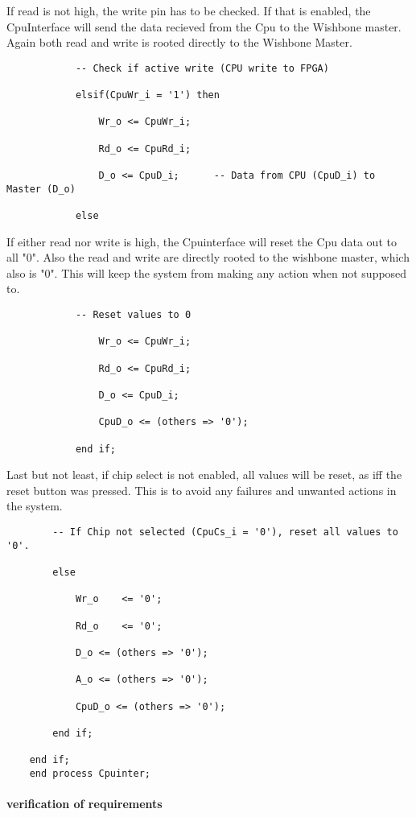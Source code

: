 If read is not high, the write pin has to be checked. If that is enabled, the CpuInterface will send the data recieved from the Cpu to the Wishbone master. Again both read and write is rooted directly to the Wishbone Master.
\begin{verbatim}
			-- Check if active write (CPU write to FPGA)

			elsif(CpuWr_i = '1') then

				Wr_o <= CpuWr_i;	

				Rd_o <= CpuRd_i;

				D_o <= CpuD_i;		-- Data from CPU (CpuD_i) to Master (D_o)

			else
\end{verbatim}


If either read nor write is high, the Cpuinterface will reset the Cpu data out to all "0". Also the read and write are directly rooted to the wishbone master, which also is "0". This will keep the system from making any action when not supposed to. 
\begin{verbatim}
			-- Reset values to 0

				Wr_o <= CpuWr_i;

				Rd_o <= CpuRd_i;

				D_o <= CpuD_i;

				CpuD_o <= (others => '0');

			end if;
\end{verbatim}

Last but not least, if chip select is not enabled, all values will be reset, as iff the reset button was pressed. This is to avoid any failures and unwanted actions in the system. 
\begin{verbatim}
		-- If Chip not selected (CpuCs_i = '0'), reset all values to '0'.

		else 

			Wr_o	<= '0';

			Rd_o 	<= '0';

			D_o	<= (others => '0');

			A_o	<= (others => '0');

			CpuD_o <= (others => '0');

		end if;

	end if;
	end process Cpuinter;
\end{verbatim}

\paragraph{verification of requirements}\mbox{}\\


